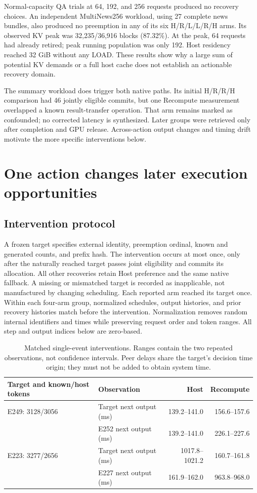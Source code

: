 \documentclass[10pt,a4paper]{article}
\begin{document}
Normal-capacity QA trials at 64, 192, and 256 requests produced no recovery
choices. An independent MultiNews256 workload, using 27 complete news bundles,
also produced no preemption in any of its six H/R/L/L/R/H arms. Its observed
KV peak was 32,235/36,916 blocks (87.32\%). At the peak, 64 requests had already
retired; peak running population was only 192. Host residency reached 32 GiB
without any LOAD. These results show why a large sum of potential KV demands
or a full host cache does not establish an actionable recovery domain.

The summary workload does trigger both native paths. Its initial H/R/R/H
comparison had 46 jointly eligible commits, but one Recompute measurement
overlapped a known result-transfer operation. That arm remains marked as
confounded; no corrected latency is synthesized. Later groups were retrieved
only after completion and GPU release. Across-action output changes and timing
drift motivate the more specific interventions below.

\section{One action changes later execution opportunities}
\subsection{Intervention protocol}
A frozen target specifies external identity, preemption ordinal, known and
generated counts, and prefix hash. The intervention occurs at most once, only
after the naturally reached target passes joint eligibility and commits its
allocation. All other recoveries retain Host preference and the same native
fallback. A missing or mismatched target is recorded as inapplicable, not
manufactured by changing scheduling. Each reported arm reached its target once.
Within each four-arm group, normalized schedules, output histories, and prior
recovery histories match before the intervention. Normalization removes random
internal identifiers and times while preserving request order and token ranges.
All step and output indices below are zero-based.

\begin{table}[t]
\centering\small
\caption{Matched single-event interventions. Ranges contain the two repeated
observations, not confidence intervals. Peer delays share the target's decision
time origin; they must not be added to obtain system time.}
\label{tab:events}
\begin{tabular}{@{}llrr@{}}
\toprule
Target and known/host tokens & Observation & Host & Recompute \\
\midrule
E249: 3128/3056 & Target next output (ms) & 139.2--141.0 & 156.6--157.6 \\
 & E252 next output (ms) & 139.2--141.0 & 226.1--227.6 \\
E223: 3277/2656 & Target next output (ms) & 1017.8--1021.2 & 160.7--161.8 \\
 & E227 next output (ms) & 161.9--162.0 & 963.8--968.0 \\
\bottomrule
\end{tabular}
\end{table}
\end{document}
